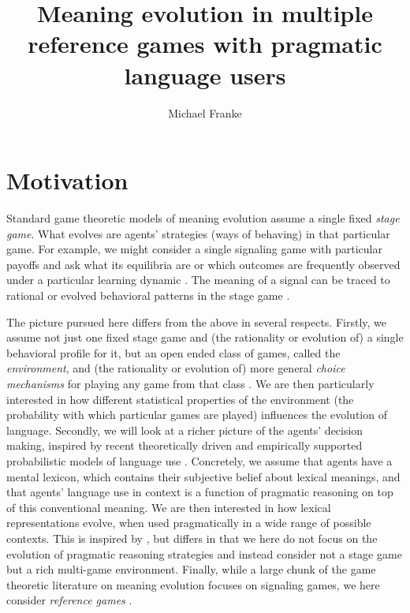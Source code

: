 \documentclass[fleqn,reqno,12pt]{article}
\title{Meaning evolution in multiple reference games with pragmatic language users}
\author{Michael Franke}
\date{}
\begin{document}
\maketitle

\section{Motivation}

Standard game theoretic models of meaning evolution assume a single fixed \emph{stage
  game}. What evolves are agents' strategies (ways of behaving) in that particular game. For
example, we might consider a single signaling game with particular payoffs and ask what its
equilibria are or which outcomes are frequently observed under a particular learning dynamic
\citep{Skyrms2010:Signals,HutteggerZollman2011:Signaling-Games}. The meaning of a signal can be
traced to rational or evolved behavioral patterns in the stage game
\citep{Lewis_1969:Convention,Hutteger:2007_Evol_Indicatives_Imperatives,Skyrms2010_Flow}.

The picture pursued here differs from the above in several respects. Firstly, we assume not
just one fixed stage game and (the rationality or evolution of) a single behavioral profile for
it, but an open ended class of games, called the \emph{environment}, and (the rationality or
evolution of) more general \emph{choice mechanisms} for playing any game from that class
\citep{FawcettHamblin2013:Exposing-the-be,McNamara2013:Towards-a-Riche,FrankeGaleazzi2014:On-the-Evolutio,GaleazziFranke2016:Smart-Transform}. We
are then particularly interested in how different statistical properties of the environment
(the probability with which particular games are played) influences the evolution of
language. Secondly, we will look at a richer picture of the agents' decision making, inspired
by recent theoretically driven and empirically supported probabilistic models of language use
\citep{FrankGoodman2012:Predicting-Prag,FrankeJager2015:Probabilistic-p,GoodmanFrank2016:Pragmatic-Langu}. Concretely,
we assume that agents have a mental lexicon, which contains their subjective belief about
lexical meanings, and that agents' language use in context is a function of pragmatic reasoning
on top of this conventional meaning. We are then interested in how lexical representations
evolve, when used pragmatically in a wide range of possible contexts. This is inspired by
\citet{BrochhagenFranke2017:Co-evolution-of}, but differs in that we here do not focus on the
evolution of pragmatic reasoning strategies and instead consider not a stage game but a rich
multi-game environment. Finally, while a large chunk of the game theoretic literature on
meaning evolution focuses on signaling games, we here consider \emph{reference games}
\citep{Franke2012:Scales-Salience,Franke2012:On-Scales-Salie}.
\end{document}
